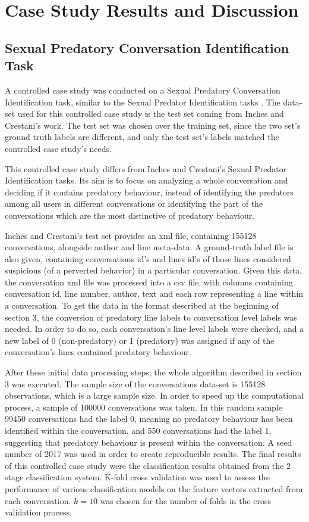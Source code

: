 \documentclass[11pt]{article}
\begin{document}
\section{Case Study Results and Discussion}
\subsection{Sexual Predatory Conversation Identification Task}
A controlled case study was conducted on a Sexual Predatory Conversation Identification task, similar to the Sexual Predator Identification tasks \cite{inches2012overview}. The data-set used for this controlled case study is the test set coming from Inches and Crestani's work. The test set was chosen over the training set, since the two set's ground truth labels are different, and only the test set's labels matched the controlled case study's needs.

This controlled case study differs from Inches and Crestani's Sexual Predator Identification tasks. Its aim is to focus on analyzing a whole conversation and deciding if it contains predatory behaviour, instead of identifying the predators among all users in different conversations or identifying the part of the conversations which are the most distinctive of predatory behaviour. 

Inches and Crestani's test set provides an xml file, containing 155128 conversations, alongside author and line meta-data. A ground-truth label file is also given, containing conversations id's and lines id's of those lines considered suspicious (of a perverted behavior) in a particular conversation. Given this data, the conversation xml file was processed into a csv file, with columns containing conversation id, line number, author, text and each row representing a line within a conversation. To get the data in the format described at the beginning of section 3, the conversion of predatory line labels to conversation level labels was needed. In order to do so, each conversation's line level labels were checked, and a new label of 0 (non-predatory) or 1 (predatory) was assigned if any of the conversation's lines contained predatory behaviour.


After these initial data processing steps, the whole algorithm described in section 3 was executed. The sample size of the conversations data-set is 155128 observations, which is a large sample size. In order to speed up the computational process, a sample of 100000 conversations was taken. In this random sample 99450 conversations had the label 0, meaning no predatory behaviour has been identified within the conversation, and 550 conversations had the label 1, suggesting that predatory behaviour is present within the conversation. A seed number of 2017 was used in order to create reproducible results. The final results of this controlled case study were the classification results obtained from the 2 stage classification system. K-fold cross validation was used to assess the performance of various classification models on the feature vectors extracted from each conversation. $k=10$ was chosen for the number of folds in the cross validation process.
\end{document}
